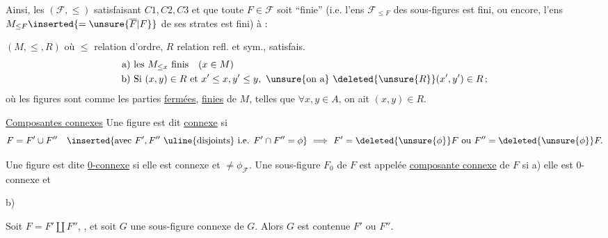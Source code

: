  Ainsi, les  $(\mathcal F,\leq)$ satisfaisant $C1,C2,C3$ et  que toute $F\in\mathcal F$ soit ``finie'' (i.e. l'ens $\mathcal F_{\leq F}$ des sous-figures est fini, ou encore, l'ens $M_{\leq F}\inserted{=\unsure{\overline F|F}}$  de  ses strates est fini)  à :

$(M,\leq,R)$  où $\leq$ relation d'ordre, $R$ relation refl. et sym., satisfais. 
\[
\begin{aligned}
\text{a) }&\text{les }M_{\leq x}\text{ finis}\quad(x\in M)\\
\text{b) }&\text{Si }(x,y)\in R\text{ et }x'\leq x,y'\leq y,\ \text{\unsure{on a} }\deleted{\unsure{R}}(x',y')\in R\,;
\end{aligned}
\]
où les figures sont  comme les parties \uline{fermées}, \uline{finies}  de $M$, telles que $\forall x,y\in A$, on ait $(x,y)\in R$.


\uline{Composantes connexes} Une figure est dit \uline{connexe} si 
\[
F=F'\cup F''\quad
\inserted{\text{avec }F',F''\ \text{\uline{disjoints} i.e. }F'\cap F''=\phi}
\ \Longrightarrow\ F'=\deleted{\unsure{\phi}}F\ \text{ou }F''=\deleted{\unsure{\phi}}F.
\]


Une figure est dite \uline{0-connexe} si elle est connexe et $\ne\phi_{\mathcal F}$. Une sous-figure $F_0$ de $F$ est appelée \uline{composante connexe} de $F$ si a) elle est 0-connexe et

b)   

  Soit $F=F'\amalg F''$, , et soit $G$ une sous-figure connexe de $G$. Alors $G$ est contenue  $F'$ ou $F''$.
